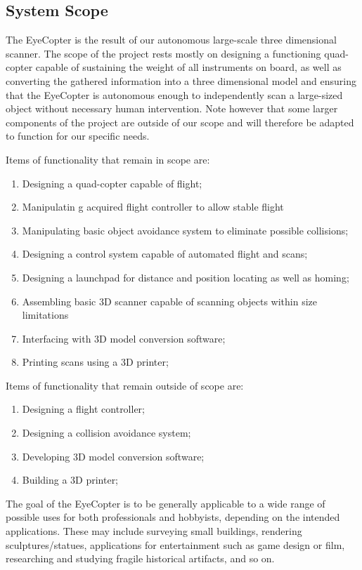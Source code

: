 \documentclass[10pt,letterpaper]{article}
\begin{document}
\subsection{System Scope}
The EyeCopter is the result of our autonomous large-scale three dimensional scanner. The scope of the project rests mostly on designing a functioning quad-copter capable of sustaining the weight of all instruments on board, as well as converting the gathered information into a three dimensional model and ensuring that the EyeCopter is autonomous enough to independently scan a large-sized object without necessary human intervention. Note however that some larger components of the project are outside of our scope and will therefore be adapted to function for our specific needs. \par 
Items of functionality that remain in scope are: 
\begin{enumerate}
	\item Designing a quad-copter capable of flight;
    \item Manipulatin g acquired flight controller to allow stable flight
    \item Manipulating basic object avoidance system to eliminate possible collisions;
    \item Designing a control system capable of automated flight and scans; 
    \item Designing a launchpad for distance and position locating as well as homing;
    \item Assembling basic 3D scanner capable of scanning objects within size limitations
    \item Interfacing with 3D model conversion software;
    \item Printing scans using a 3D printer;
\end{enumerate}
Items of functionality that remain outside of scope are:
\begin{enumerate}
	\item Designing a flight controller;
    \item Designing a collision avoidance system;
    \item Developing 3D model conversion software;
    \item Building a 3D printer;
\end{enumerate}
The goal of the EyeCopter is to be generally applicable to a wide range of possible uses for both professionals and hobbyists, depending on the intended applications. These may include surveying small buildings, rendering sculptures/statues, applications for entertainment such as game design or film, researching and studying fragile historical artifacts, and so on. 
\end{document}
